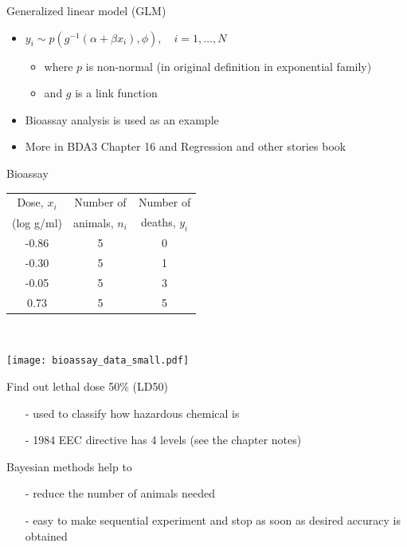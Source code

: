 \documentclass[finnish,english,t]{beamer}
\begin{document}
\begin{frame}{Generalized linear model (GLM)}

  \begin{itemize}
  \item<+-> $y_i \sim p(g^{-1}(\alpha + \beta x_i), \phi), \quad i = 1,\dots,N$
    \begin{itemize}
    \item where $p$ is non-normal (in original definition in
      exponential family)
    \item and $g$ is a link function
    \end{itemize}
  \item<+-> Bioassay analysis is used as an example
  \item<+-> More in BDA3 Chapter 16 and Regression and other stories
    book
  \end{itemize}
  
\end{frame}

\begin{frame}{Bioassay}

{\footnotesize\vspace{-1mm}
    \begin{tabular}{c c c}
      \vspace{-1mm} Dose, $x_i$ & Number of & Number of \\
      (log g/ml) & animals, $n_i$ & deaths, $y_i$ \\
      \hline \vspace{-1mm}
      -0.86 & 5 & \color{red} 0 \\ \vspace{-1mm}
      -0.30 & 5 & \color{red} 1 \\ \vspace{-1mm}
      -0.05 & 5 & \color{red} 3 \\ \vspace{-1mm}
       0.73 & 5 & \color{red} 5
    \end{tabular}
  }~\parbox[t][3cm][b]{3.5cm}{\texttt{[image: bioassay\_data\_small.pdf]}}
  \vspace{2mm}
  \pause

  \vspace{-\baselineskip}
  Find out lethal dose 50\% (LD50)
    \begin{itemize}
      \item[-] used to classify how hazardous chemical is
      \item[-] 1984 EEC directive has 4 levels (see the chapter notes)
      \end{itemize}
      
  \pause
   Bayesian methods help to
    \begin{itemize}
    \item[-] reduce the number of animals needed
    \item[-] easy to make sequential experiment and stop as soon as
      desired accuracy is obtained
    \end{itemize}

\end{frame}
\end{document}
